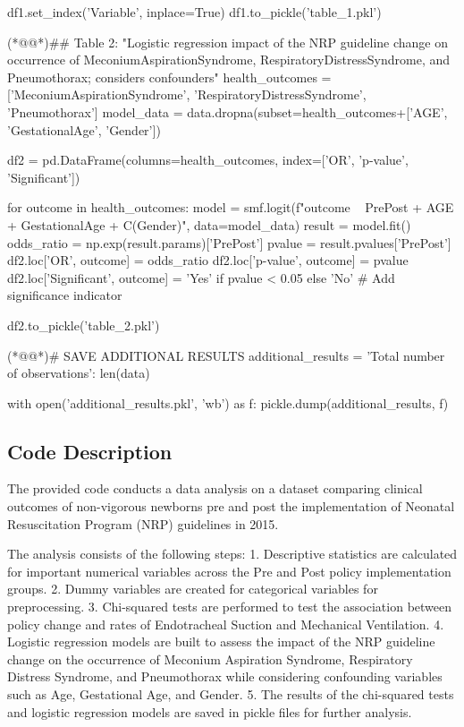\documentclass[11pt]{article}
\begin{document}
\begin{python}
df1.set_index('Variable', inplace=True)
df1.to_pickle('table_1.pkl')

(*@@*)## Table 2: "Logistic regression impact of the NRP guideline change on occurrence of MeconiumAspirationSyndrome, RespiratoryDistressSyndrome, and Pneumothorax; considers confounders"
health_outcomes = ['MeconiumAspirationSyndrome', 'RespiratoryDistressSyndrome', 'Pneumothorax']
model_data = data.dropna(subset=health_outcomes+['AGE', 'GestationalAge', 'Gender'])

df2 = pd.DataFrame(columns=health_outcomes, index=['OR', 'p-value', 'Significant'])

for outcome in health_outcomes:
    model = smf.logit(f"{outcome} ~ PrePost + AGE + GestationalAge + C(Gender)", data=model_data)
    result = model.fit()
    odds_ratio = np.exp(result.params)['PrePost']
    pvalue = result.pvalues['PrePost']
    df2.loc['OR', outcome] = odds_ratio
    df2.loc['p-value', outcome] = pvalue
    df2.loc['Significant', outcome] = 'Yes' if pvalue < 0.05 else 'No' # Add significance indicator

df2.to_pickle('table_2.pkl')

(*@@*)# SAVE ADDITIONAL RESULTS
additional_results = {
    'Total number of observations': len(data)
}

with open('additional_results.pkl', 'wb') as f:
     pickle.dump(additional_results, f)

\end{python}

\subsection{Code Description}

The provided code conducts a data analysis on a dataset comparing clinical outcomes of non-vigorous newborns pre and post the implementation of Neonatal Resuscitation Program (NRP) guidelines in 2015. 

The analysis consists of the following steps:
1. Descriptive statistics are calculated for important numerical variables across the Pre and Post policy implementation groups.
2. Dummy variables are created for categorical variables for preprocessing.
3. Chi-squared tests are performed to test the association between policy change and rates of Endotracheal Suction and Mechanical Ventilation.
4. Logistic regression models are built to assess the impact of the NRP guideline change on the occurrence of Meconium Aspiration Syndrome, Respiratory Distress Syndrome, and Pneumothorax while considering confounding variables such as Age, Gestational Age, and Gender.
5. The results of the chi-squared tests and logistic regression models are saved in pickle files for further analysis.
\end{document}
